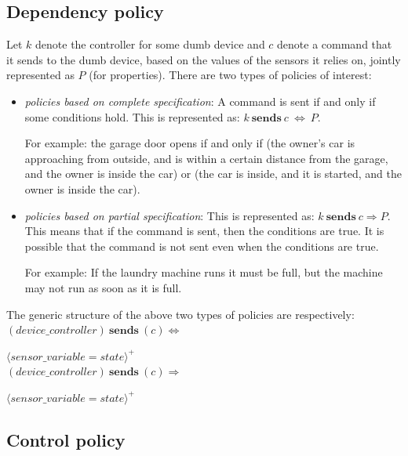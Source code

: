 \documentclass{article}
\begin{document}
\subsection{Dependency policy}
\label{subsec:dep}
Let $k$ denote the controller for some dumb device and $c$ denote a command that it sends to the dumb device, based on the values of the sensors it relies on, jointly represented as $P$ (for properties). 
There are two types of policies of interest:
\begin{itemize}
\item \textit {policies based on complete specification}: A command is sent if and only if some conditions hold. This is represented as: $k ~\textbf{sends}~ c~\Leftrightarrow~P$.  

For example:
the garage door opens if and only if (the owner's car is approaching from outside, and is within a certain distance from the garage, and the owner is inside the car) or (the car is inside, and it is started, and the owner is inside the car).

\item \textit {policies based on partial specification}:  This is represented as: $k ~\textbf{sends}~ c \Rightarrow P$. This means that if the command is sent, then the conditions are true. It is possible that the command is not sent even when the conditions are true. 

For example: If the laundry machine runs it must be full, but the machine may not run as soon as it is full.
\end{itemize}
The generic structure of the above two types of policies are respectively:\\

\hspace{2cm}$(device\_controller) ~\textbf{sends}~(c) \Leftrightarrow$

\hspace{2cm}$\langle \mathit{sensor\_variable = state}\rangle^{+}$ \\

\hspace{2cm}$(device\_controller) ~\textbf{sends}~(c) \Rightarrow$

\hspace{2cm}$\langle \mathit{sensor\_variable = state}\rangle^{+}$ \\

\subsection{Control policy}
\label{subsec:control}
\end{document}
